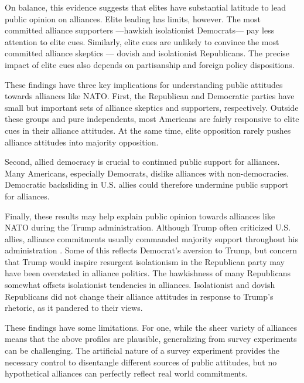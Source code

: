 \documentclass[12pt]{article}
\begin{document}
On balance, this evidence suggests that elites have substantial latitude to lead public opinion on alliances.
Elite leading has limits, however. 
The most committed alliance supporters ---hawkish isolationist Democrats--- pay less attention to elite cues.
Similarly, elite cues are unlikely to convince the most committed alliance skeptics --- dovish and isolationist Republicans. 
The precise impact of elite cues also depends on partisanship and foreign policy dispositions. 



These findings have three key implications for understanding public attitudes towards alliances like NATO. 
First, the Republican and Democratic parties have small but important sets of alliance skeptics and supporters, respectively.
Outside these groups and pure independents, most Americans are fairly responsive to elite cues in their alliance attitudes. 
At the same time, elite opposition rarely pushes alliance attitudes into majority opposition. 


Second, allied democracy is crucial to continued public support for alliances.
Many Americans, especially Democrats, dislike alliances with non-democracies. 
Democratic backsliding in U.S. allies could therefore undermine public support for alliances. 



Finally, these results may help explain public opinion towards alliances like NATO during the Trump administration.
Although Trump often criticized U.S. allies, alliance commitments usually commanded majority support throughout his administration \citep{PewNATO2020}. 
Some of this reflects Democrat's aversion to Trump, but concern that Trump would inspire resurgent isolationism in the Republican party may have been overstated in alliance politics. 
The hawkishness of many Republicans somewhat offsets isolationist tendencies in alliances.
Isolationist and dovish Republicans did not change their alliance attitudes in response to Trump's rhetoric, as it pandered to their views. 


These findings have some limitations. 
For one, while the sheer variety of alliances means that the above profiles are plausible, generalizing from survey experiments can be challenging. 
The artificial nature of a survey experiment provides the necessary control to disentangle different sources of public attitudes, but no hypothetical alliances can perfectly reflect real world commitments.
\end{document}
